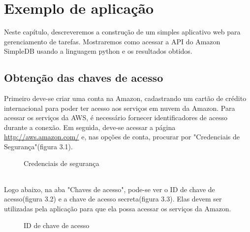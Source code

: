 \chapter{Exemplo de aplicação}
Neste capítulo, descreveremos a construção de um simples aplicativo web para gerenciamento de tarefas. Mostraremos como acessar a API do Amazon SimpleDB usando a linguagem python e os resultados obtidos.

\section{Obtenção das chaves de acesso}
Primeiro deve-se criar uma conta na Amazon, cadastrando um cartão de crédito internacional para poder ter acesso aos serviços em nuvem da Amazon. Para acessar os serviços da AWS, é necessário fornecer identificadores de acesso durante a conexão. Em seguida, deve-se acessar a página \url{http://aws.amazon.com/} e, nas opções de conta, procurar por "Credenciais de Segurança"(figura 3.1).
\\
\begin{figure}
	\centering
	\label{fig:acesso_credenciais}
	\caption{Credenciais de segurança}
\end{figure}
\\
Logo abaixo, na aba "Chaves de acesso", pode-se ver o ID de chave de acesso(figura 3.2) e a chave de acesso secreta(figura 3.3). Elas devem ser utilizadas pela aplicação para que ela possa acessar os serviços da Amazon.
\\
\begin{figure}
	\centering
	\label{fig:id_chave_acesso}
	\caption{ID de chave de acesso}
\end{figure}
